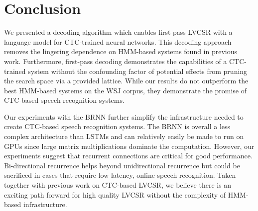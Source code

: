\section{Conclusion}

We presented a decoding algorithm which enables first-pass LVCSR with a
language model for CTC-trained neural networks. This decoding approach removes
the lingering dependence on HMM-based systems found in previous work.
Furthermore, first-pass decoding demonstrates the capabilities of a CTC-trained
system without the confounding factor of potential effects from pruning the
search space via a provided lattice. While our results do not outperform the
best HMM-based systems on the WSJ corpus, they demonstrate the promise of
CTC-based speech recognition systems.

Our experiments with the BRNN further simplify the infrastructure needed to
create CTC-based speech recognition systems. The BRNN is overall a less complex
architecture than LSTMs and can relatively easily be made to run on GPUs since
large matrix multiplications dominate the computation. However, our experiments
suggest that recurrent connections are critical for good performance.
Bi-directional recurrence helps beyond unidirectional recurrence but could be
sacrificed in cases that require low-latency, online speech recognition. Taken
together with previous work on CTC-based LVCSR, we believe there is an exciting
path forward for high quality LVCSR without the complexity of HMM-based
infrastructure.
